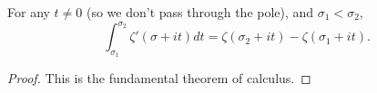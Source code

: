 \begin{lemma}
\label{Zeta_eq_int_derivZeta}
\leanok
For any $t\ne0$ (so we don't pass through the pole), and $\sigma_1 < \sigma_2$,
  $$
  \int_{\sigma_1}^{\sigma_2}\zeta'(\sigma + it) dt =
  \zeta(\sigma_2+it) - \zeta(\sigma_1+it).
  $$
\end{lemma}
\begin{proof}
\leanok
This is the fundamental theorem of calculus.
\end{proof}
